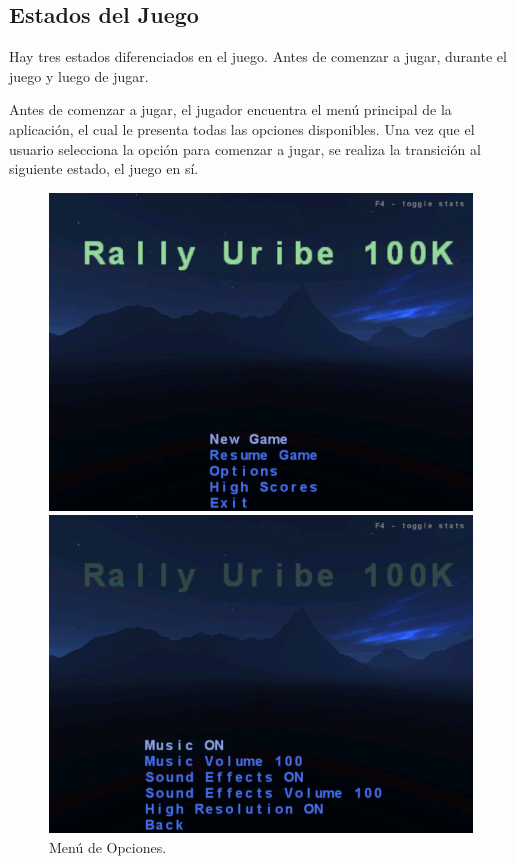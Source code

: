 \documentclass[a4paper,10pt]{article}
\begin{document}
\subsection{Estados del Juego}
Hay tres estados diferenciados en el juego.  Antes de comenzar a jugar, durante
el juego y luego de jugar.

Antes de comenzar a jugar, el jugador encuentra el men\'u principal de la
aplicaci\'on, el cual le presenta todas las opciones disponibles.  Una vez que
el
usuario selecciona la opci\'on para comenzar a jugar, se realiza la transici\'on
al
siguiente estado, el juego en s\'i.

\begin{figure}
\begin{minipage}[b]{0.5\linewidth}
\centering
 \includegraphics[scale=0.250]{./main_menu.png}
 \caption{Men\'u Principal.}
\label{fig:figure0}
\end{minipage}
\hspace{0.5cm}
\begin{minipage}[b]{0.5\linewidth}
\centering
 \includegraphics[scale=0.250]{./options_menu.png}
 \caption{Men\'u de Opciones.}
\label{fig:figure00}
\end{minipage}
\end{figure}
\end{document}
